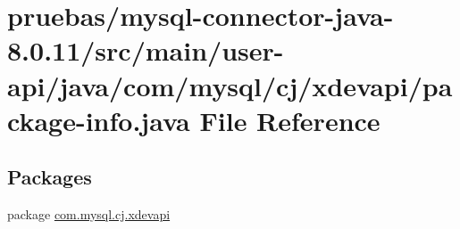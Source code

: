 \hypertarget{main_2user-api_2java_2com_2mysql_2cj_2xdevapi_2package-info_8java}{}\section{pruebas/mysql-\/connector-\/java-\/8.0.11/src/main/user-\/api/java/com/mysql/cj/xdevapi/package-\/info.java File Reference}
\label{main_2user-api_2java_2com_2mysql_2cj_2xdevapi_2package-info_8java}
\subsection*{Packages}
\begin{DoxyCompactItemize}
\item 
package \mbox{\hyperlink{namespacecom_1_1mysql_1_1cj_1_1xdevapi}{com.\+mysql.\+cj.\+xdevapi}}
\end{DoxyCompactItemize}

